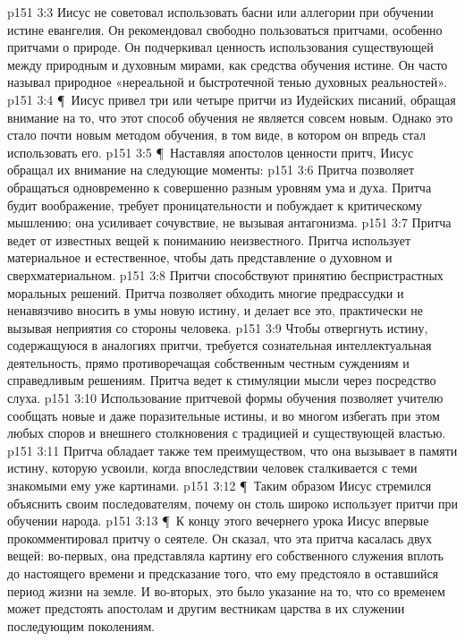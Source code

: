 \vs p151 3:3 \bibnobreakspace Иисус не советовал использовать басни или аллегории при обучении истине евангелия. Он рекомендовал свободно пользоваться притчами, особенно притчами о природе. Он подчеркивал ценность использования  существующей между природным и духовным мирами, как средства обучения истине. Он часто называл природное «нереальной и быстротечной тенью духовных реальностей».
\vs p151 3:4 \P\ \bibnobreakspace Иисус привел три или четыре притчи из Иудейских писаний, обращая внимание на то, что этот способ обучения не является совсем новым. Однако это стало почти новым методом обучения, в том виде, в котором он впредь стал использовать его.
\vs p151 3:5 \P\ \bibnobreakspace Наставляя апостолов ценности притч, Иисус обращал их внимание на следующие моменты:
\vs p151 3:6 Притча позволяет обращаться одновременно к совершенно разным уровням ума и духа. Притча будит воображение, требует проницательности и побуждает к критическому мышлению; она усиливает сочувствие, не вызывая антагонизма.
\vs p151 3:7 Притча ведет от известных вещей к пониманию неизвестного. Притча использует материальное и естественное, чтобы дать представление о духовном и сверхматериальном.
\vs p151 3:8 Притчи способствуют принятию беспристрастных моральных решений. Притча позволяет обходить многие предрассудки и ненавязчиво вносить в умы новую истину, и делает все это, практически не вызывая неприятия со стороны человека.
\vs p151 3:9 Чтобы отвергнуть истину, содержащуюся в аналогиях притчи, требуется сознательная интеллектуальная деятельность, прямо противоречащая собственным честным суждениям и справедливым решениям. Притча ведет к стимуляции мысли через посредство слуха.
\vs p151 3:10 Использование притчевой формы обучения позволяет учителю сообщать новые и даже поразительные истины, и во многом избегать при этом любых споров и внешнего столкновения с традицией и существующей властью.
\vs p151 3:11 Притча обладает также тем преимуществом, что она вызывает в памяти истину, которую усвоили, когда впоследствии человек сталкивается с теми знакомыми ему уже картинами.
\vs p151 3:12 \P\ Таким образом Иисус стремился объяснить своим последователям, почему он столь широко использует притчи при обучении народа.
\vs p151 3:13 \P\ К концу этого вечернего урока Иисус впервые прокомментировал притчу о сеятеле. Он сказал, что эта притча касалась двух вещей: во\hyp{}первых, она представляла картину его собственного служения вплоть до настоящего времени и предсказание того, что ему предстояло в оставшийся период жизни на земле. И во\hyp{}вторых, это было указание на то, что со временем может предстоять апостолам и другим вестникам царства в их служении последующим поколениям.
